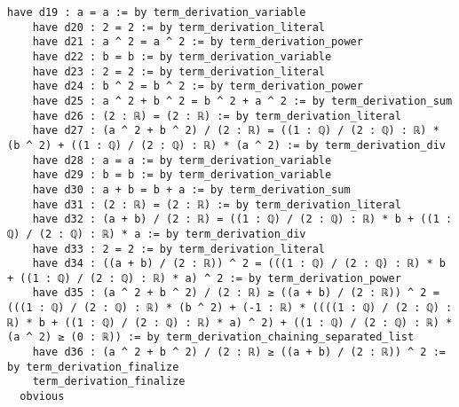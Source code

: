 \documentclass{article}
\begin{document}
\begin{tcolorbox}[colback=white!10, width=\linewidth]
\begin{lstlisting}[language=Lean4]
    have d19 : a = a := by term_derivation_variable
    have d20 : 2 = 2 := by term_derivation_literal
    have d21 : a ^ 2 = a ^ 2 := by term_derivation_power
    have d22 : b = b := by term_derivation_variable
    have d23 : 2 = 2 := by term_derivation_literal
    have d24 : b ^ 2 = b ^ 2 := by term_derivation_power
    have d25 : a ^ 2 + b ^ 2 = b ^ 2 + a ^ 2 := by term_derivation_sum
    have d26 : (2 : ℝ) = (2 : ℝ) := by term_derivation_literal
    have d27 : (a ^ 2 + b ^ 2) / (2 : ℝ) = ((1 : ℚ) / (2 : ℚ) : ℝ) * (b ^ 2) + ((1 : ℚ) / (2 : ℚ) : ℝ) * (a ^ 2) := by term_derivation_div
    have d28 : a = a := by term_derivation_variable
    have d29 : b = b := by term_derivation_variable
    have d30 : a + b = b + a := by term_derivation_sum
    have d31 : (2 : ℝ) = (2 : ℝ) := by term_derivation_literal
    have d32 : (a + b) / (2 : ℝ) = ((1 : ℚ) / (2 : ℚ) : ℝ) * b + ((1 : ℚ) / (2 : ℚ) : ℝ) * a := by term_derivation_div
    have d33 : 2 = 2 := by term_derivation_literal
    have d34 : ((a + b) / (2 : ℝ)) ^ 2 = (((1 : ℚ) / (2 : ℚ) : ℝ) * b + ((1 : ℚ) / (2 : ℚ) : ℝ) * a) ^ 2 := by term_derivation_power
    have d35 : (a ^ 2 + b ^ 2) / (2 : ℝ) ≥ ((a + b) / (2 : ℝ)) ^ 2 = (((1 : ℚ) / (2 : ℚ) : ℝ) * (b ^ 2) + (-1 : ℝ) * ((((1 : ℚ) / (2 : ℚ) : ℝ) * b + ((1 : ℚ) / (2 : ℚ) : ℝ) * a) ^ 2) + ((1 : ℚ) / (2 : ℚ) : ℝ) * (a ^ 2) ≥ (0 : ℝ)) := by term_derivation_chaining_separated_list
    have d36 : (a ^ 2 + b ^ 2) / (2 : ℝ) ≥ ((a + b) / (2 : ℝ)) ^ 2 := by term_derivation_finalize
    term_derivation_finalize
  obvious

\end{lstlisting}
\end{tcolorbox}
\end{document}
